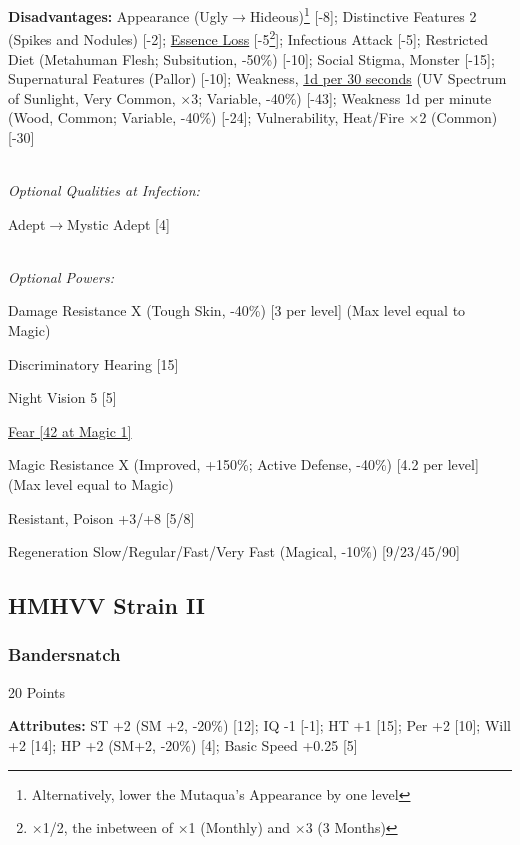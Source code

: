 \begin{multicols*}{3}
	\textbf{Disadvantages:}	
	Appearance (Ugly$\rightarrow$Hideous)\footnote{Alternatively, lower the Mutaqua's Appearance by one level} [-8]; Distinctive Features 2 (Spikes and Nodules) [-2]; \hyperref[essence_loss]{Essence Loss} [-5\footnote{$\times$1/2, the inbetween of $\times$1 (Monthly) and $\times$3 (3 Months)}]; Infectious Attack [-5]; Restricted Diet (Metahuman Flesh; Subsitution, -50\%) [-10]; Social Stigma, Monster [-15]; Supernatural Features (Pallor) [-10]; Weakness, \textcolor{Blue}{\href{http://forums.sjgames.com/showpost.php?p=149688&postcount=7}{1d per 30 seconds}} (UV Spectrum of Sunlight, Very Common, $\times$3; Variable, -40\%) [-43]; Weakness 1d per minute (Wood, Common; Variable, -40\%) [-24]; Vulnerability, Heat/Fire $\times$2 (Common) [-30]
	
	\textit{\\Optional Qualities at Infection:}
	
	Adept$\rightarrow$Mystic Adept [4]
	
	\textit{\\Optional Powers:}
		
	Damage Resistance X (Tough Skin, -40\%) [3 per level] (Max level equal to Magic)
		
	Discriminatory Hearing [15]

	Night Vision 5 [5]
	
	\hyperref[fear]{Fear [42 at Magic 1]}
	
	Magic Resistance X (Improved, +150\%; Active Defense, -40\%) [4.2 per level] (Max level equal to Magic)
	
	Resistant, Poison +3/+8 [5/8]
	
	Regeneration Slow/Regular/Fast/Very Fast (Magical, -10\%) [9/23/45/90]	
	
	\subsection*{HMHVV Strain II}
		
	\subsubsection{Bandersnatch}\label{bandersnatch}
	\begin{flushright}
		20 Points
	\end{flushright}

	\textbf{Attributes:}
	ST +2 (SM +2, -20\%) [12]; IQ -1 [-1]; HT +1 [15]; Per +2 [10]; Will +2 [14]; HP +2 (SM+2, -20\%) [4]; Basic Speed  +0.25 [5]
	

\end{multicols*}
